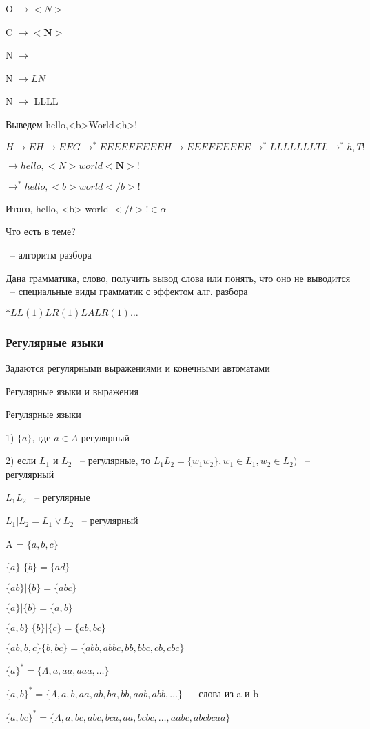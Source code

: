\documentclass[russian]{lecture-notes}
\begin{document}
	O $\rightarrow <N>$

	C $\rightarrow <\mathbf{N}>$

	N $\rightarrow$

	N $\rightarrow LN$

	N $\rightarrow$ LLLL

	Выведем hello,<b>World<h>!

	$H \rightarrow EH \rightarrow EEG \rightarrow^{*} EEEEEEEEEH \rightarrow EEEEEEEEE \rightarrow^{*} LLLLLLLTL \rightarrow^{*} h,T!$

	$\rightarrow hello, <N> world <\mathbf{N}>!$

	$\rightarrow^{*} hello, <b> world </b>!$

	Итого, hello, <b> world $</t>! \in \alpha$

	Что есть в теме?

	~-- алгоритм разбора

		Дана грамматика, слово, получить вывод слова или понять, что оно не выводится ~-- специальные виды грамматик с эффектом алг. разбора

	$*LL(1) LR(1) LALR(1) \dots$

	\subsubsection{Регулярные языки}

	Задаются регулярными выражениями и конечными автоматами

	Регулярные языки и выражения

	\begin{definition}

		Регулярные языки

		1) $\{a\}$, где $a \in A$ регулярный

		2) если $L_{1}$ и $L_{2}$ ~-- регулярные, то $L_{1}L_{2} = \{w_{1}w_{2}\}, w_{1} \in L_{1}, w_{2} \in L_{2})$ ~-- регулярный

		$L_{1}L_{2}$ ~-- регулярные

		$L_{1}|L_{2} = L_{1} \lor L_{2}$ ~-- регулярный

		\end{definition}

	\begin{example}

		A = $\{a,b,c\}$

		$\{a\}$ \qquad $\{b\} = \{ad\}$

		$\{ab\}|\{b\}=\{abc\}$

		$\{a\}|\{b\} = \{a,b\}$

		$\{a,b\}|\{b\}|\{c\} = \{ab,bc\}$

		$\{ab,b,c\}\{b,bc\} = \{abb,abbc,bb,bbc,cb,cbc\}$

		$\{a\}^{*} = \{\Lambda,a,aa,aaa,\dots \} $

		$\{a,b\}^{*} = \{\Lambda,a,b,aa,ab,ba,bb,aab,abb,\dots \}$ ~-- слова из a и b

		$\{a,bc\}^{*} = \{\Lambda,a,bc,abc,bca,aa,bcbc,\dots,aabc,abcbcaa \}$

		\end{example}
\end{document}
